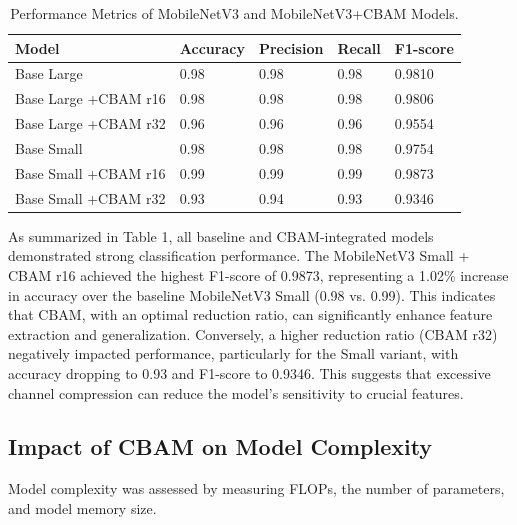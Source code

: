 \documentclass[preprint,12pt]{elsarticle}
\begin{document}
\begin{table}[t]
\centering
    \begin{tabularx}{\textwidth}{ |l|X|X|X|X| }
     \hline
     \textbf{Model} & \textbf{Accuracy} & \textbf{Precision} & \textbf{Recall} & \textbf{F1-score} \\
     \hline
     Base Large & 0.98 & 0.98 & 0.98 & 0.9810 \\
     Base Large +CBAM r16 & 0.98 & 0.98 & 0.98 & 0.9806 \\
     Base Large +CBAM r32 & 0.96 & 0.96 & 0.96 & 0.9554 \\
     \hline
     Base Small & 0.98 & 0.98 & 0.98 & 0.9754 \\
     Base Small +CBAM r16 & 0.99 & 0.99 & 0.99 & 0.9873 \\
     Base Small +CBAM r32 & 0.93 & 0.94 & 0.93 & 0.9346 \\
     \hline
    \end{tabularx}
    \caption{Performance Metrics of MobileNetV3 and MobileNetV3+CBAM Models.}
    \label{tab:performance-result}
\end{table}

As summarized in Table 1, all baseline and CBAM-integrated models demonstrated strong classification performance. The MobileNetV3 Small + CBAM r16 achieved the highest F1-score of 0.9873, representing a 1.02\% increase in accuracy over the baseline MobileNetV3 Small (0.98 vs. 0.99). This indicates that CBAM, with an optimal reduction ratio, can significantly enhance feature extraction and generalization. Conversely, a higher reduction ratio (CBAM r32) negatively impacted performance, particularly for the Small variant, with accuracy dropping to 0.93 and F1-score to 0.9346. This suggests that excessive channel compression can reduce the model's sensitivity to crucial features.

\subsection{Impact of CBAM on Model Complexity}

Model complexity was assessed by measuring FLOPs, the number of parameters, and model memory size.
\end{document}
